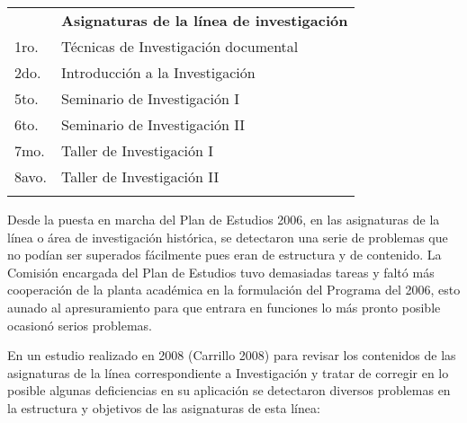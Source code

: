 \medskip
\begin{flushleft}
\tablefirsthead{}
\tablehead{}
\tabletail{}
\tablelasttail{}
\begin{supertabular}{|m{0.2\textwidth}|m{0.75\textwidth}|}
\hline
{}\\\hline
{} &
{\small\bfseries Asignaturas de la línea de investigación}\\\hline
1ro. &
 Técnicas de Investigación documental\\\hline
2do.  &
 Introducción a la Investigación\\\hline
5to. &
 Seminario de Investigación I\\\hline
6to. &
 Seminario de Investigación II\\\hline
7mo. &
 Taller de Investigación I\\\hline
8avo. &
 Taller de Investigación II\\\hline\hline
{}\\\hline
\end{supertabular}
\end{flushleft}

\bigskip
Desde la puesta en marcha del Plan de Estudios 2006, en las asignaturas 
de la línea o área de investigación histórica, se detectaron una serie 
de problemas que no podían ser superados fácilmente pues eran de 
estructura y de contenido. La Comisión encargada del Plan de Estudios 
tuvo demasiadas tareas y faltó más cooperación de la planta académica 
en la formulación del Programa del 2006, esto aunado al apresuramiento 
para que entrara en funciones lo más pronto posible ocasionó serios 
problemas.

En un estudio realizado en 2008 (Carrillo 2008) para revisar los 
contenidos de las asignaturas de la línea correspondiente a 
Investigación y tratar de corregir en lo posible algunas deficiencias 
en su aplicación se detectaron diversos problemas en la estructura y 
objetivos de las asignaturas de esta línea:

